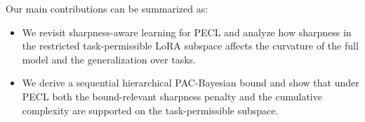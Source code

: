 \documentclass{article}
\theoremstyle{plain}
\theoremstyle{definition}
\theoremstyle{remark}
\begin{document}
Our main contributions can be summarized as:
\begin{itemize}
\vspace{-8pt}
\item
We revisit sharpness-aware learning for PECL and analyze how sharpness in the restricted task-permissible LoRA subspace affects the curvature of the full model and the generalization over tasks.
\vspace{-2pt}
\item
We derive a sequential hierarchical PAC-Bayesian bound and show that under PECL both the bound-relevant sharpness penalty and the cumulative complexity are supported on the task-permissible subspace.

\end{itemize}
\end{document}
